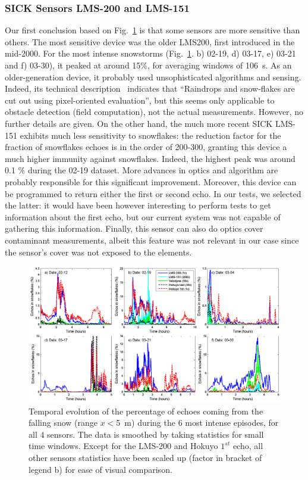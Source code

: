\subsubsection{SICK Sensors LMS-200 and LMS-151}
Our first conclusion based on Fig.~\ref{fig:TimingSnow} is that some sensors are more sensitive than others. The most sensitive device was the older LMS200, first introduced in the mid-2000. For the most intense snowstorms (Fig.~\ref{fig:TimingSnow}. b) 02-19, d) 03-17, e) 03-21 and f) 03-30), it peaked at around 15\%, for averaging windows of \SI{106}{\second}. As an older-generation device, it probably used unsophisticated algorithms and sensing. Indeed, its technical description~\cite{LMS200Manual} indicates that ``Raindrops and snow-flakes are cut out using pixel-oriented evaluation'', but this seems only applicable to  obstacle detection (field computation), not the actual measurements. However, no further details are given. On the other hand, the much more recent SICK LMS-151 exhibits much less sensitivity to snowflakes: the reduction factor for the fraction of snowflakes echoes is in the order of 200-300, granting this device a much higher immunity against snowflakes. Indeed, the highest peak was around 0.1 \% during the 02-19 dataset. More advances in optics and algorithm are probably responsible for this significant improvement. Moreover, this device can be programmed to return either the first or second echo. In our tests, we selected the latter: it would have been however interesting to perform tests to get information about the first echo, but our current system was not capable of gathering this information. Finally, this sensor can also do optics cover contaminant measurements, albeit this feature was not relevant in our case since the sensor's cover was not exposed to the elements.

\begin{figure}[th]
    \centering
    \includegraphics[width=0.98\linewidth]{./img/TimingSnow.png}
    \caption{Temporal evolution of the percentage of echoes coming from the falling snow (range $x<$\SI{5}{\meter}) during the 6 most intense episodes, for all 4 sensors. The data is smoothed by taking statistics for small time windows. Except for the LMS-200 and Hokuyo $1^{st}$ echo, all other sensors statistics have been scaled up (factor in bracket of legend b) for ease of visual comparison.}
    \label{fig:TimingSnow}
\end{figure}


